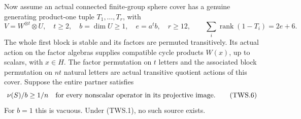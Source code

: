 Now assume an actual connected finite-group sphere cover has a genuine
generating product-one tuple \(T_1,\ldots,T_r\), with
\[
 V=W^{\otimes t}\otimes U,\quad t\ge2,\quad b=\dim U\ge1,
 \quad e=a^t b,\quad r\ge12,
 \qquad\sum_i\operatorname{rank}(1-T_i)=2e+6.
 \tag{TWS.5}
\]
The whole first block is stable and its factors are permuted
transitively. Its actual action on the factor algebras supplies
compatible cycle products \(W(x)\), up to scalars, with \(x\in H\).
The factor permutation on \(t\) letters and the associated block
permutation on \(nt\) natural letters are actual transitive quotient
actions of this cover. Suppose the entire partner satisfies
\[
        \nu(S)/b\ge1/n\quad
        \hbox{for every nonscalar operator in its projective image}.
        \tag{TWS.6}
\]
For \(b=1\) this is vacuous. Under (TWS.1), no such source exists.

